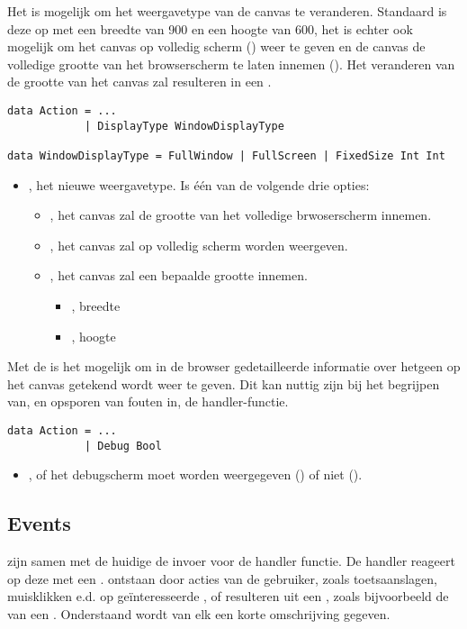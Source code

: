 Het is mogelijk om het weergavetype van de canvas te veranderen. Standaard is deze op  met een breedte van 900 en een hoogte van 600, het is echter ook mogelijk om het canvas op volledig scherm () weer te geven en de canvas de volledige grootte van het browserscherm te laten innemen (). Het veranderen van de grootte van het canvas zal resulteren in een  {\color{red} }.
\begin{lstlisting}
data Action = ...
			| DisplayType WindowDisplayType
			
data WindowDisplayType = FullWindow | FullScreen | FixedSize Int Int
\end{lstlisting}
\begin{itemize}
	\item {}, het nieuwe weergavetype. Is één van de volgende drie opties:
		\begin{itemize}
			\item {}, het canvas zal de grootte van het volledige brwoserscherm innemen.
			\item {}, het canvas zal op volledig scherm worden weergeven.
			\item {}, het canvas zal een bepaalde grootte innemen. 
				\begin{itemize}
					\item {}, breedte
					\item {}, hoogte
				\end{itemize}
		\end{itemize}
\end{itemize}

Met de  is het mogelijk om in de browser gedetailleerde informatie over hetgeen op het canvas getekend wordt weer te geven. Dit kan nuttig zijn bij het begrijpen van, en opsporen van fouten in, de handler-functie.
\begin{lstlisting}
data Action = ...
			| Debug Bool
\end{lstlisting}
\begin{itemize}
	\item {}, of het debugscherm moet worden weergegeven () of niet ().
\end{itemize}

\subsection{Events}
\events zijn samen met de huidige  de invoer voor de handler functie. De handler reageert op deze \events met een . \events ontstaan door acties van de gebruiker, zoals toetsaanslagen, muisklikken e.d. op geïnteresseerde \shapes, of resulteren uit een , zoals bijvoorbeeld de  van een .
Onderstaand wordt van elk  een korte omschrijving gegeven.

